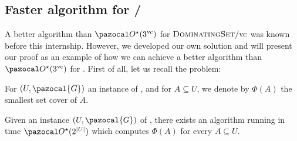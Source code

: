 \subsection{Faster algorithm for /\vc}
\label{section:domset-vc}

A better algorithm than $\O^\star(3^\vc)$ for $\textsc{DominatingSet}/\text{vc}$ was known before this internship. However, we developed our own solution and will present our proof as an example of how we can achieve a better algorithm than $\O^\star(3^\vc)$ for . First of all, let us recall the  problem:

\begin{problem}
\end{problem}

For $(U, \pazocal{G})$ an instance of , and for $A \subseteq U$, we denote by $\Phi(A)$ the smallest set cover of $A$.

\begin{lemma}
    \label{lemma:set-cover}
    Given an instance $(U, \pazocal{G})$ of , there exists an algorithm running in time $\O^\star(2^{|U|})$ which computes $\Phi(A)$ for every $A \subseteq U$.
\end{lemma}

